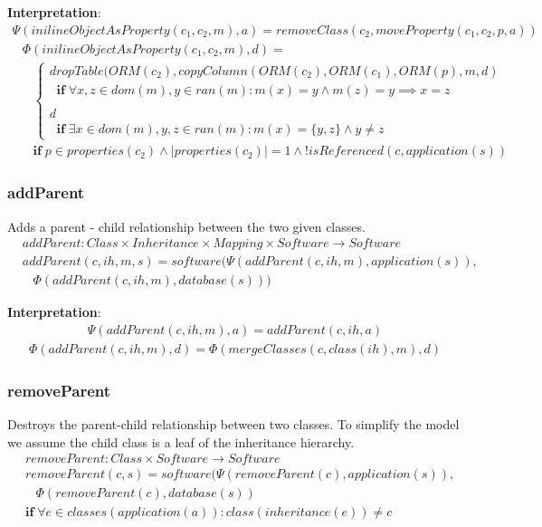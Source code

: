\documentclass[10pt]{article}
\begin{document}
\noindent \textbf{Interpretation}:
\begin{align}
\Psi(inilineObjectAsProperty(c_1, c_2, m), a) =  removeClass(c_2, moveProperty(c_1, c_2, p, a))  
\end{align}
\begin{align}
& \Phi(inilineObjectAsProperty(c_1, c_2, m), d) = \nonumber \\ 
& \;\;\; \begin{cases}
 dropTable(ORM(c_2), copyColumn(ORM(c_2), ORM(c_1), ORM(p), m, d) \\
\;\; \mathbf{if} \;  \forall x, z \in dom(m), y \in ran(m) : m(x) = y \land  
 m(z) = y \implies x = z 
 \\\\
 d \\
 \;\; \mathbf{if} \; \exists x \in dom(m), y, z \in ran(m) : m(x) = \{y, z\} \land y \neq z
 \end{cases} \nonumber \\
& \;\;\; \mathbf{if} \; p \in properties(c_2) \land |properties(c_2)| = 1 \land ! isReferenced(c,application(s)) 
\end{align}


\subsubsection{addParent}
Adds a parent - child relationship between the two given classes.
\begin{align}
& addParent: Class \times Inheritance \times Mapping \times Software \rightarrow Software \nonumber \\
& addParent(c, ih, m, s) = software(\Psi(addParent(c, ih, m), application(s)), \nonumber \\
& \;\;\;  \Phi(addParent(c, ih, m), database(s)))
\end{align}

\noindent \textbf{Interpretation}:
\begin{align}
\Psi(addParent(c, ih, m), a) = addParent(c, ih, a)
\end{align}
\begin{align}
\Phi(addParent(c, ih, m), d) = \Phi(mergeClasses(c, class(ih), m), d)
\end{align}

\subsubsection{removeParent}
Destroys the parent-child relationship between two classes. To simplify the model we assume the child class is a leaf of the inheritance hierarchy.
\begin{align}
& removeParent: Class \times Software \rightarrow Software \nonumber \\
& removeParent(c, s) = software(\Psi(removeParent(c), application(s)), \nonumber \\
& \;\;\;  \Phi(removeParent(c), database(s)) \nonumber \\
& \mathbf{if} \; \forall e \in classes(application(a)) : class(inheritance(e)) \neq c
\end{align}
\end{document}
